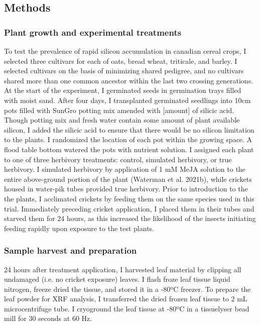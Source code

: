 \documentclass[12pt, letterpaper, ]{article}
\begin{document}
\subsection{Methods}

\subsubsection{Plant growth and experimental treatments}

To test the prevalence of rapid silicon accumulation in canadian cereal crops, I selected three cultivars for each of oats, bread wheat, triticale, and barley. I selected cultivars on the basis of minimizing shared pedigree, and no cultivars shared more than one common ancestor within the last two crossing generations. At the start of the experiment, I germinated seeds in germination trays filled with moist sand. After four days, I transplanted germinated seedlings into 10cm pots filled with SunGro potting mix amended with [amount] of silicic acid. Though potting mix and fresh water contain some amount of plant available silicon, I added the silicic acid to ensure that there would be no silicon limitation to the plants. I randomized the location of each pot within the growing space. A flood table bottom watered the pots with nutrient solution. I assigned each plant to one of three herbivory treatments: control, simulated herbivory, or true herbivory. I simulated herbivory by application of 1 mM MeJA solution to the entire above-ground portion of the plant (Waterman et al. 2021b), while crickets housed in water-pik tubes provided true herbivory. Prior to introduction to the the plants, I acclimated crickets by feeding them on the same species used in this trial. Immediately preceding cricket application, I placed them in their tubes and starved them for 24 hours, as this increased the likelihood of the insects initiating feeding rapidly upon exposure to the test plants. 

\subsubsection{Sample harvest and preparation}

24 hours after treatment application, I harvested leaf material by clipping all undamaged (i.e. no cricket exposure) leaves. I flash froze leaf tissue liquid nitrogen, freeze dried the tissue, and stored it in a -80ºC freezer. To prepare the leaf powder for XRF analysis, I transferred the dried frozen leaf tissue to 2 mL microcentrifuge tube. I cryoground the leaf tissue at -80ºC in a tissuelyser bead mill for 30 seconds at 60 Hz.
\end{document}
